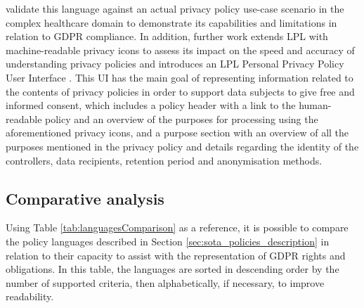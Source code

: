 \cite{gerl_privacy_2019} validate this language against an actual privacy policy use-case scenario in the complex healthcare domain to demonstrate its capabilities and limitations in relation to GDPR compliance.
In addition, further work extends LPL with machine-readable privacy icons \citep{gerl_extending_2018} to assess its impact on the speed and accuracy of understanding privacy policies and introduces an LPL Personal Privacy Policy User Interface \citep{gerl_interface_2018}.
This UI has the main goal of representing information related to the contents of privacy policies in order to support data subjects to give free and informed consent, which includes a policy header with a link to the human-readable policy and an overview of the purposes for processing using the aforementioned privacy icons, and a purpose section with an overview of all the purposes mentioned in the privacy policy and details regarding the identity of the controllers, data recipients, retention period and anonymisation methods.

\subsection{Comparative analysis}
\label{sec:sota_policies_analysis}

Using Table \ref{tab:languagesComparison} as a reference, it is possible to compare the policy languages described in Section \ref{sec:sota_policies_description} in relation to their capacity to assist with the representation of GDPR rights and obligations.
In this table, the languages are sorted in descending order by the number of supported criteria, then alphabetically, if necessary, to improve readability.

